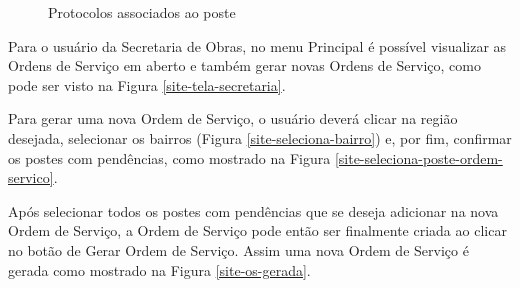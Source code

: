 \documentclass[
	article,			%
	11pt,				%
	oneside,			%
	a4paper,			%
	english,			%
	brazil,				%
	sumario=tradicional
	]{abntex2}
\begin{document}
\begin{figure}[!htbp]
 \centering
 \caption{\label{site-protocolos-poste}Protocolos associados ao poste}
\end{figure}

\clearpage

Para o usuário da Secretaria de Obras, no menu Principal é possível visualizar as Ordens de Serviço em aberto e também gerar novas Ordens de Serviço, como pode ser visto na Figura \ref{site-tela-secretaria}.

Para gerar uma nova Ordem de Serviço, o usuário deverá clicar na região desejada, selecionar os bairros (Figura \ref{site-seleciona-bairro}) e, por fim, confirmar os postes com pendências, como mostrado na Figura \ref{site-seleciona-poste-ordem-servico}.

Após selecionar todos os postes com pendências que se deseja adicionar na nova Ordem de Serviço, a Ordem de Serviço pode então ser finalmente criada ao clicar no botão de Gerar Ordem de Serviço.
Assim uma nova Ordem de Serviço é gerada como mostrado na Figura \ref{site-os-gerada}.
\end{document}
